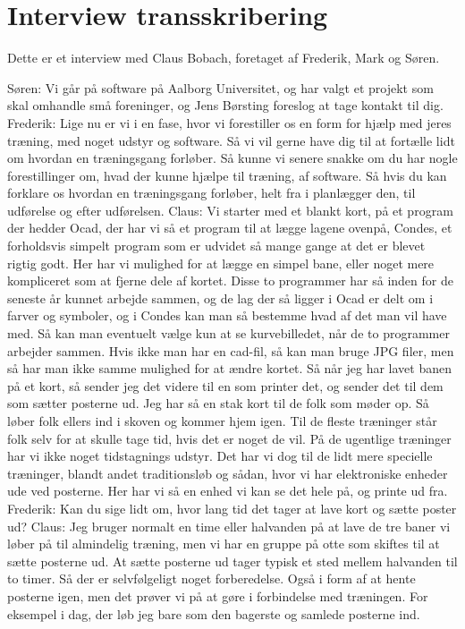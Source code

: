 \chapter{Interview transskribering}
Dette er et interview med Claus Bobach, foretaget af Frederik, Mark og Søren. 

Søren: Vi går på software på Aalborg Universitet, og har valgt et projekt som skal omhandle små foreninger, og Jens Børsting foreslog at tage kontakt til dig.\newline
Frederik: Lige nu er vi i en fase, hvor vi forestiller os en form for hjælp med jeres træning, med noget udstyr og software. Så vi vil gerne have dig til at fortælle lidt om hvordan en træningsgang forløber. Så kunne vi senere snakke om du har nogle forestillinger om, hvad der kunne hjælpe til træning, af software. Så hvis du kan forklare os hvordan en træningsgang forløber, helt fra i planlægger den, til udførelse og efter udførelsen.\newline
Claus: Vi starter med et blankt kort, på et program der hedder Ocad, der har vi så et program til at lægge lagene ovenpå, Condes, et forholdsvis simpelt program som er udvidet så mange gange at det er blevet rigtig godt. Her har vi mulighed for at lægge en simpel bane, eller noget mere kompliceret som at fjerne dele af kortet. Disse to programmer har så inden for de seneste år kunnet arbejde sammen, og de lag der så ligger i Ocad er delt om i farver og symboler, og i Condes kan man så bestemme hvad af det man vil have med. Så kan man eventuelt vælge kun at se kurvebilledet, når de to programmer arbejder sammen. Hvis ikke man har en cad-fil, så kan man bruge JPG filer, men så har man ikke samme mulighed for at ændre kortet. 
Så når jeg har lavet banen på et kort, så sender jeg det videre til en som printer det, og sender det til dem som sætter posterne ud. Jeg har så en stak kort til de folk som møder op. Så løber folk ellers ind i skoven og kommer hjem igen. \newline
Til de fleste træninger står folk selv for at skulle tage tid, hvis det er noget de vil. På de ugentlige træninger har vi ikke noget tidstagnings udstyr. Det har vi dog til de lidt mere specielle træninger, blandt andet traditionsløb og sådan, hvor vi har elektroniske enheder ude ved posterne. Her har vi så en enhed vi kan se det hele på, og printe ud fra. \newline
Frederik: Kan du sige lidt om, hvor lang tid det tager at lave kort og sætte poster ud?\newline
Claus: Jeg bruger normalt en time eller halvanden på at lave de tre baner vi løber på til almindelig træning, men vi har en gruppe på otte som skiftes til at sætte posterne ud. At sætte posterne ud tager typisk et sted mellem halvanden til to timer. Så der er selvfølgeligt noget forberedelse. Også i form af at hente posterne igen, men det prøver vi på at gøre i forbindelse med træningen. For eksempel i dag, der løb jeg bare som den bagerste og samlede posterne ind.\newline
